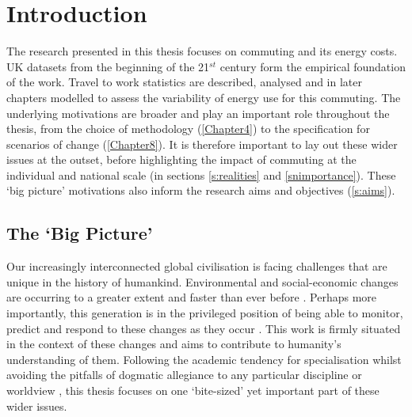 \documentclass[a4paper, 11pt, twoside]{Thesis}
\begin{document}
\pagestyle{empty}  



\mainmatter	  
\pagestyle{fancy}  



\chapter{Introduction} 
\label{Chapter1}
\fancyhead[RE,LO]{\thepage}
The research presented in this thesis focuses on commuting and its energy costs.
UK datasets from the beginning of the 21$^{st}$ century form the empirical
foundation of the work. Travel to work statistics are described, analysed and in later
chapters modelled to assess the variability of energy use for this commuting.
The underlying motivations are broader and play an important role
throughout the thesis, from the choice of methodology (\cref{Chapter4}) to the
specification for scenarios of change (\cref{Chapter8}).
It is therefore important to lay out these wider issues at the outset, before
highlighting the impact of commuting at the individual and national scale (in
sections \ref{s:realities} and \ref{snimportance}). These `big picture'
motivations also inform the research aims and objectives (\cref{s:aims}).

\section{The `Big Picture'}
Our increasingly interconnected global civilisation is facing challenges
that are unique in the history of humankind. Environmental
and social-economic changes are occurring to a greater extent and faster
than ever before \citep{Rifkin2011a, ehrlich2013can}. Perhaps more
importantly, this generation is in the privileged position of being able to monitor,
predict and respond to these changes as they occur \citep{Evans1998,
Smil2008, IPCC2007}.
This work is firmly situated in the context of these changes and aims to
contribute to humanity's understanding of them.
Following the academic tendency for specialisation
 whilst avoiding the pitfalls of dogmatic allegiance to any particular
discipline or worldview \citep{kates1986geography},
this thesis focuses on one `bite-sized' yet important part of these wider
issues.
\end{document}
